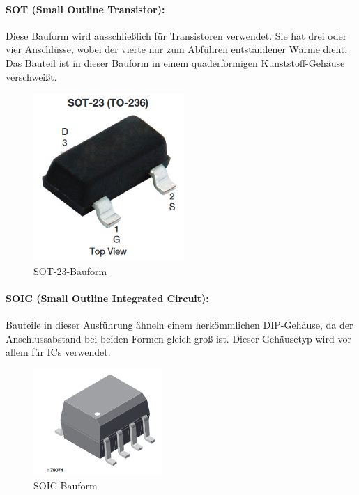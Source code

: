\paragraph{SOT (Small Outline Transistor):}
Diese Bauform wird ausschließlich für Transistoren verwendet. Sie hat drei oder vier Anschlüsse, wobei der vierte nur zum Abführen entstandener Wärme dient. Das Bauteil ist in dieser Bauform in einem quaderförmigen Kunststoff-Gehäuse verschweißt.
\begin{figure}[H]
	\centering
	\includegraphics{images/technische_grundlagen/sot-23.png}
	\caption{SOT-23-Bauform \cite[vgl.][]{vishay-sot}}
\end{figure}

\paragraph{SOIC (Small Outline Integrated Circuit):}
Bauteile in dieser Ausführung ähneln einem herkömmlichen DIP-Gehäuse, da der Anschlussabstand bei beiden Formen gleich groß ist. Dieser Gehäusetyp wird vor allem für ICs verwendet.
\begin{figure}[H]
	\centering
	\includegraphics{images/technische_grundlagen/soic.png}
	\caption{SOIC-Bauform \cite[vgl.][]{vishay-soic}}
\end{figure}

